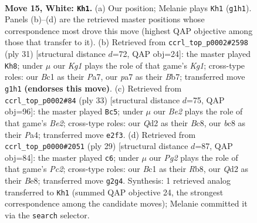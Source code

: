 \documentclass[11pt]{article}
\begin{document}
\clearpage

\begin{figure}[p]\centering
\begin{subfigure}{0.46\textwidth}\centering
\resizebox{\linewidth}{!}{%
\newchessgame
\chessboard[
  setfen={r1br2k1/ppp2p1p/3p1qp1/4b3/N1P1Pn2/7P/PP1QBPP1/R1B2RK1 w - - 9 15},
  showmover=false,
  pgfstyle=straightmove, color=movearrow, markmove={g1-h1}
]}
\caption{}
\end{subfigure}\hfill
\begin{subfigure}{0.46\textwidth}\centering
\resizebox{\linewidth}{!}{%
\newchessgame
\chessboard[
  setfen={r3r1k1/pbqn1ppB/2pb3p/1p2p3/3P4/P3PN1P/1PQ2PP1/R1BR2K1 b - - 3 16},
  showmover=false,
  pgfstyle=straightmove, color=movearrow, markmove={g8-h8}
]}
\caption{}
\end{subfigure}
\\[4pt]
\begin{subfigure}{0.46\textwidth}\centering
\resizebox{\linewidth}{!}{%
\newchessgame
\chessboard[
  setfen={r1b1r1k1/1pq1bppp/5n2/4pN2/p7/2P2QB1/PPB2PPP/R4RK1 b - - 3 17},
  showmover=false,
  pgfstyle=straightmove, color=movearrow, markmove={e7-c5}
]}
\caption{}
\end{subfigure}\hfill
\begin{subfigure}{0.46\textwidth}\centering
\resizebox{\linewidth}{!}{%
\newchessgame
\chessboard[
  setfen={1r1qbrk1/ppp1bp1p/5np1/1N2Np2/2BP4/1Q2P1P1/PP3P1P/R2R2K1 b - - 2 15},
  showmover=false,
  pgfstyle=straightmove, color=movearrow, markmove={c7-c6}
]}
\caption{}
\end{subfigure}
\caption{\textbf{Move 15, White: \texttt{Kh1}.} (a) Our position; Melanie plays \texttt{Kh1} (\texttt{g1h1}). Panels (b)--(d) are the retrieved master positions whose correspondence most drove this move (highest QAP objective among those that transfer to it). (b) Retrieved from \texttt{ccrl\_top\_p0002\#2598} (ply 31) [structural distance $d$=72, QAP obj=24]: the master played \texttt{Kh8}; under $\mu$ our \emph{Kg1} plays the role of that game's \emph{Kg1}; cross-type roles: our \emph{B}c1 as their \emph{P}a7, our \emph{p}a7 as their \emph{B}b7; transferred move \texttt{g1h1} \textbf{(endorses this move)}. (c) Retrieved from \texttt{ccrl\_top\_p0002\#84} (ply 33) [structural distance $d$=75, QAP obj=96]: the master played \texttt{Bc5}; under $\mu$ our \emph{Be2} plays the role of that game's \emph{Be2}; cross-type roles: our \emph{Q}d2 as their \emph{B}c8, our \emph{b}c8 as their \emph{P}a4; transferred move \texttt{e2f3}. (d) Retrieved from \texttt{ccrl\_top\_p0000\#2051} (ply 29) [structural distance $d$=87, QAP obj=84]: the master played \texttt{c6}; under $\mu$ our \emph{Pg2} plays the role of that game's \emph{Pc2}; cross-type roles: our \emph{B}c1 as their \emph{R}b8, our \emph{Q}d2 as their \emph{B}e8; transferred move \texttt{g2g4}. Synthesis: 1 retrieved analog transferred to \texttt{Kh1} (summed QAP objective 24, the strongest correspondence among the candidate moves); Melanie committed it via the \texttt{search} selector.}
\label{fig:thought-m28}
\end{figure}
\end{document}
